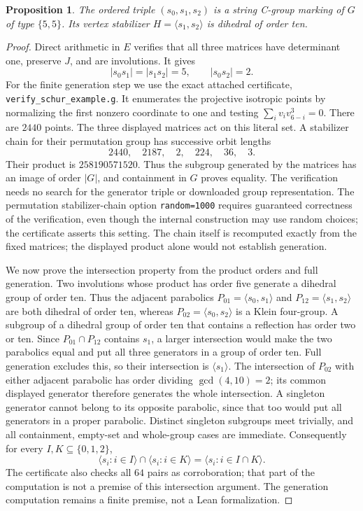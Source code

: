 \documentclass[11pt,a4paper]{article}
\newtheorem{proposition}[theorem]{Proposition}
\begin{document}
\begin{proposition}\label{marking}
The ordered triple $(s_0,s_1,s_2)$ is a string C-group marking of
$G$ of type $\{5,5\}$. Its vertex stabilizer $H=\langle s_1,s_2\rangle$
is dihedral of order ten.
\end{proposition}
\begin{proof}
Direct arithmetic in $E$ verifies that all three matrices have
determinant one, preserve $J$, and are involutions. It gives
\[
 |s_0s_1|=|s_1s_2|=5,\qquad |s_0s_2|=2.
\]
For the finite generation step we use the exact attached certificate,
\texttt{verify\_schur\_example.g}. It enumerates the projective
isotropic points by normalizing the first nonzero coordinate to one
and testing $\sum_i v_i v_{6-i}^3=0$. There are $2440$ points.
The three displayed matrices act on this literal set. A stabilizer
chain for their permutation group has successive orbit lengths
\[
 2440,\quad2187,\quad2,\quad224,\quad36,\quad3.
\]
Their product is $258190571520$. Thus the subgroup generated by the
matrices has an image of order $|G|$, and containment in $G$ proves
equality. The verification needs no search for the generator triple or
downloaded group representation. The permutation stabilizer-chain
option \texttt{random=1000} requires guaranteed correctness of the
verification, even though the internal construction may use random
choices; the certificate asserts this setting. The chain itself is recomputed exactly from the fixed
matrices; the displayed product alone would not establish generation.

We now prove the intersection property from the product orders and
full generation. Two involutions whose product has order five generate
a dihedral group of order ten. Thus the adjacent parabolics
$P_{01}=\langle s_0,s_1\rangle$ and
$P_{12}=\langle s_1,s_2\rangle$ are both dihedral of order ten,
whereas $P_{02}=\langle s_0,s_2\rangle$ is a Klein four-group.
A subgroup of a dihedral group of order ten that contains a reflection
has order two or ten. Since $P_{01}\cap P_{12}$ contains $s_1$,
a larger intersection would make the two parabolics equal and put
all three generators in a group of order ten. Full generation excludes
this, so their intersection is $\langle s_1\rangle$.
The intersection of $P_{02}$ with either adjacent parabolic has order
dividing $\gcd(4,10)=2$; its common displayed generator therefore
generates the whole intersection. A singleton generator cannot belong
to its opposite parabolic, since that too would put all generators in
a proper parabolic. Distinct singleton subgroups meet trivially, and
all containment, empty-set and whole-group cases are immediate.
Consequently for every $I,K\subseteq\{0,1,2\}$,
\[
 \langle s_i:i\in I\rangle\cap\langle s_i:i\in K\rangle
 =\langle s_i:i\in I\cap K\rangle.
\]
The certificate also checks all $64$ pairs as corroboration; that part
of the computation is not a premise of this intersection argument.
The generation computation remains a finite premise, not a Lean
formalization.
\end{proof}
\end{document}
